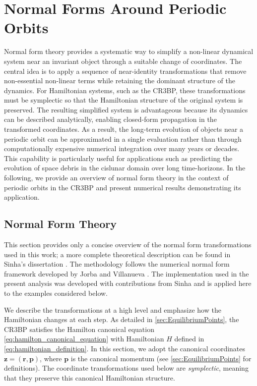 \newpage
\section{Normal Forms Around Periodic Orbits} \label{sec:NormalForms}

Normal form theory provides a systematic way to simplify a non-linear dynamical system near an invariant object through a suitable change of coordinates. 
The central idea is to apply a sequence of near-identity transformations that remove non-essential non-linear terms while retaining the dominant structure of the dynamics. 
For Hamiltonian systems, such as the CR3BP, these transformations must be symplectic so that the Hamiltonian structure of the original system is preserved. 
The resulting simplified system is advantageous because its dynamics can be described analytically, enabling closed-form propagation in the transformed coordinates. 
As a result, the long-term evolution of objects near a periodic orbit can be approximated in a single evaluation rather than through computationally expensive numerical integration over many years or decades. 
This capability is particularly useful for applications such as predicting the evolution of space debris in the cislunar domain over long time-horizons. 
In the following, we provide an overview of normal form theory in the context of periodic orbits in the CR3BP and present numerical results demonstrating its application.

\subsection{Normal Form Theory}
This section provides only a concise overview of the normal form transformations used in this work; a more complete theoretical description can be found in Sinha's dissertation \cite{Sinha2026}. 
The methodology follows the numerical normal form framework developed by Jorba and Villanueva \cite{Jorba1998,Jorba1999}. 
The implementation used in the present analysis was developed with contributions from Sinha \cite{Sinha2026} and is applied here to the examples considered below. 

We describe the transformations at a high level and emphasize how the Hamiltonian changes at each step. As detailed in \cref{sec:EquilibriumPoints}, the CR3BP satisfies the Hamilton canonical equation \eqref{eq:hamilton_canonical_equation} with Hamiltonian $H$ defined in \eqref{eq:hamiltonian_definition}.
In this section, we adopt the canonical coordinates $\boldsymbol{z} = (\boldsymbol{r}, \boldsymbol{p})$, where $\boldsymbol{p}$ is the canonical momentum (see \cref{sec:EquilibriumPoints} for definitions). The coordinate transformations used below are \emph{symplectic}, meaning that they preserve this canonical Hamiltonian structure.

